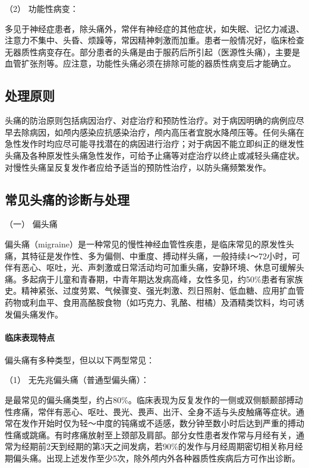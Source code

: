 \hypertarget{text00020.htmlux5cux23CHP1-7-2-2-2-2}{}
（2） 功能性病变：

多见于神经症患者，除头痛外，常伴有神经症的其他症状，如失眠、记忆力减退、注意力不集中、头昏、烦躁等，常因精神刺激而加重。患者一般情况好，临床检查无器质性病变存在。部分患者的头痛是由于服药后所引起（医源性头痛），主要是血管扩张剂等。应注意，功能性头痛必须在排除可能的器质性病变后才能确立。

\subsection{处理原则}

头痛的防治原则包括病因治疗、对症治疗和预防性治疗。对于病因明确的病例应尽早去除病因，如颅内感染应抗感染治疗，颅内高压者宜脱水降颅压等。任何头痛在急性发作时均应尽可能寻找潜在的病因进行治疗；对于病因不能立即纠正的继发性头痛及各种原发性头痛急性发作，可给予止痛等对症治疗以终止或减轻头痛症状。对慢性头痛呈反复发作者应给予适当的预防性治疗，以防头痛频繁发作。

\subsection{常见头痛的诊断与处理}

\hypertarget{text00020.htmlux5cux23CHP1-7-4-1}{}
（一） 偏头痛

偏头痛（migraine）是一种常见的慢性神经血管性疾患，是临床常见的原发性头痛，其特征是发作性、多为偏侧、中重度、搏动样头痛，一般持续4～72小时，可伴有恶心、呕吐，光、声刺激或日常活动均可加重头痛，安静环境、休息可缓解头痛。多起病于儿童和青春期，中青年期达发病高峰，女性多见，约50\%患者有家族史。精神紧张、过度劳累、气候骤变、强光刺激、烈日照射、低血糖、应用扩血管药物或利血平、食用高酪胺食物（如巧克力、乳酪、柑橘）及酒精类饮料，均可诱发偏头痛发作。

\paragraph{临床表现特点}

偏头痛有多种类型，但以以下两型常见：

\hypertarget{text00020.htmlux5cux23CHP1-7-4-1-1-1}{}
（1） 无先兆偏头痛（普通型偏头痛）：

是最常见的偏头痛类型，约占80\%。临床表现为反复发作的一侧或双侧额颞部搏动性疼痛，常伴有恶心、呕吐、畏光、畏声、出汗、全身不适与头皮触痛等症状。通常在发作开始时仅为轻～中度的钝痛或不适感，数分钟至数小时后达到严重的搏动性痛或跳痛。有时疼痛放射至上颈部及肩部。部分女性患者发作常与月经有关，通常为经期前2天到经期的第3天之间发病，若90\%的发作与月经周期密切相关称月经期偏头痛。出现上述发作至少5次，除外颅内外各种器质性疾病后方可作出诊断。

